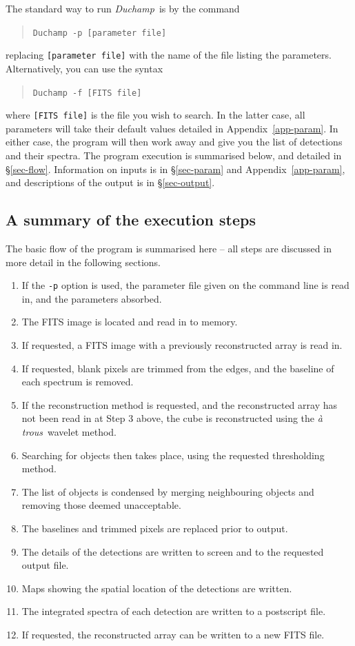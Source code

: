 \documentclass[12pt,a4paper]{article}
\newcommand{\duchamp}{\emph{Duchamp}}
\newcommand{\atrous}{\textit{{\`a} trous}}
\begin{document}
The standard way to run \duchamp\ is by the command
\begin{quote}
\texttt{Duchamp -p [parameter file]}
\end{quote}
replacing \texttt{[parameter file]} with the name of the file listing
the parameters. Alternatively, you can use the syntax
\begin{quote}
\texttt{Duchamp -f [FITS file]}
\end{quote}
where \texttt{[FITS file]} is the file you wish to search. In the latter
case, all parameters will take their default values detailed in
Appendix~\ref{app-param}. In either case, the program will then work
away and give you the list of detections and their spectra. The
program execution is summarised below, and detailed in
\S\ref{sec-flow}. Information on inputs is in \S\ref{sec-param} and
Appendix~\ref{app-param}, and descriptions of the output is in
\S\ref{sec-output}.

\subsection{A summary of the execution steps}

The basic flow of the program is summarised here -- all steps are
discussed in more detail in the following sections.
\begin{enumerate}
\item If the \texttt{-p} option is used, the parameter file given on
  the command line is read in, and the parameters absorbed.
\item The FITS image is located and read in to memory.
\item If requested, a FITS image with a previously reconstructed array
  is read in.
\item If requested, blank pixels are trimmed from the edges, and
  the baseline of each spectrum is removed.
\item If the reconstruction method is requested, and the reconstructed
  array has not been read in at Step 3 above, the cube is
  reconstructed using the \atrous\ wavelet method.
\item Searching for objects then takes place, using the requested
  thresholding method.
\item The list of objects is condensed by merging neighbouring objects
  and removing those deemed unacceptable.
\item The baselines and trimmed pixels are replaced prior to output.
\item The details of the detections are written to screen and to the
  requested output file.
\item Maps showing the spatial location of the detections are written.
\item The integrated spectra of each detection are written to a
  postscript file. 
\item If requested, the reconstructed array can be written to a new
  FITS file.
\end{enumerate}
\end{document}
